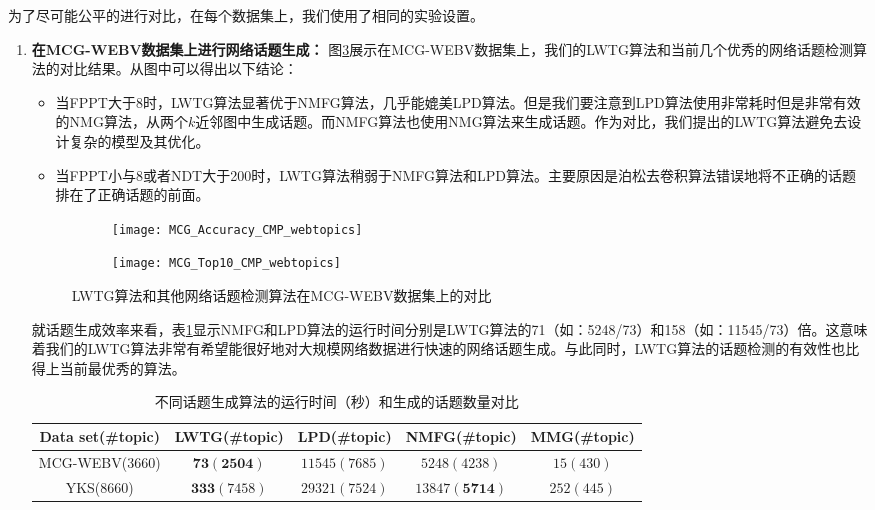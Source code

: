 为了尽可能公平的进行对比，在每个数据集上，我们使用了相同的实验设置。
\begin{enumerate}
  \item[1)] \textbf{在MCG-WEBV数据集上进行网络话题生成：} 图\ref{fig:MCG_CMP_webtopics}展示在MCG-WEBV数据集上，我们的LWTG算法和当前几个优秀的网络话题检测算法的对比结果。从图中可以得出以下结论：
  \begin{itemize}
    \item 当FPPT大于8时，LWTG算法显著优于NMFG算法\citep{pang-tao-2018-neurocomputing}，几乎能媲美LPD算法\citep{pang-tao-2016-lpd}。但是我们要注意到LPD算法使用非常耗时但是非常有效的NMG算法\citep{yang2012clustering}，从两个$k$近邻图中生成话题。而NMFG算法\citep{pang-tao-2018-neurocomputing}也使用NMG算法\citep{yang2012clustering}来生成话题。作为对比，我们提出的LWTG算法避免去设计复杂的模型及其优化。
    \item 当FPPT小与8或者NDT大于200时，LWTG算法稍弱于NMFG算法和LPD算法。主要原因是泊松去卷积算法错误地将不正确的话题排在了正确话题的前面。
  \end{itemize}

  \begin{figure}[!htbp]
    \centering
    \begin{subfigure}[b]{0.5\textwidth}
      \texttt{[image: MCG\_Accuracy\_CMP\_webtopics]}
      \caption{}
      \label{fig:MCG_Accuracy_CMP_webtopics}
    \end{subfigure}%
    \begin{subfigure}[b]{0.5\textwidth}
      \texttt{[image: MCG\_Top10\_CMP\_webtopics]}
      \caption{}
      \label{fig:MCG_Top10_CMP_webtopics}
    \end{subfigure}
    \caption{LWTG算法和其他网络话题检测算法在MCG-WEBV数据集上的对比}
    \label{fig:MCG_CMP_webtopics}
  \end{figure}
  就话题生成效率来看，表\ref{tab:webtopics_time_cmp}显示NMFG和LPD算法的运行时间分别是LWTG算法的71（如：5248/73）和158（如：11545/73）倍。这意味着我们的LWTG算法非常有希望能很好地对大规模网络数据进行快速的网络话题生成。与此同时，LWTG算法的话题检测的有效性也比得上当前最优秀的算法。
  \begin{table}[!htbp]
      \caption{不同话题生成算法的运行时间（秒）和生成的话题数量对比}
      \label{tab:webtopics_time_cmp}
      \centering
      \begin{tabular}{|c|c|c|c|c|}
          \hline
          Data set(\#topic) & LWTG(\#topic) & LPD(\#topic) & NMFG(\#topic) & MMG(\#topic)\\
          \hline
          \hline
          MCG-WEBV(3660) & $\mathbf{73}(\mathbf{2504})$ & $11545(7685)$ & $5248(4238)$ & $15(430)$\\
          \hline
          YKS(8660) & $\mathbf{333}(7458)$ & $29321(7524)$ & $13847(\mathbf{5714})$ & 2$52(445)$\\
          \hline
      \end{tabular}
  \end{table}


\end{enumerate}
